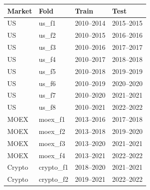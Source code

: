 \scriptsize
\setlength{\tabcolsep}{5pt}
\begin{tabular}{llll}
\toprule
Market & Fold & Train & Test \\
\midrule
US & us\_f1 & 2010--2014 & 2015--2015 \\
US & us\_f2 & 2010--2015 & 2016--2016 \\
US & us\_f3 & 2010--2016 & 2017--2017 \\
US & us\_f4 & 2010--2017 & 2018--2018 \\
US & us\_f5 & 2010--2018 & 2019--2019 \\
US & us\_f6 & 2010--2019 & 2020--2020 \\
US & us\_f7 & 2010--2020 & 2021--2021 \\
US & us\_f8 & 2010--2021 & 2022--2022 \\
MOEX & moex\_f1 & 2013--2016 & 2017--2018 \\
MOEX & moex\_f2 & 2013--2018 & 2019--2020 \\
MOEX & moex\_f3 & 2013--2020 & 2021--2021 \\
MOEX & moex\_f4 & 2013--2021 & 2022--2022 \\
Crypto & crypto\_f1 & 2018--2020 & 2021--2021 \\
Crypto & crypto\_f2 & 2019--2021 & 2022--2022 \\
\bottomrule
\end{tabular}

